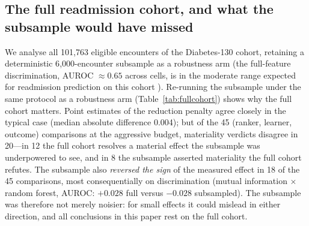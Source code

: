\documentclass[fleqn,10pt]{wlscirep}
\newcommand{\result}[1]{#1}
\begin{document}
\begin{table}[t]
\centering
\caption{Raw versus leakage-safe Platt- and isotonic-recalibrated reduction penalty at 25\,\% of
features (mean paired difference vs.\ full over the twelve datasets, \emph{all three rankers}, and
three learners---108 cells; positive ECE/Brier/AURC values indicate degradation, as do negative
AUROC/net-benefit values), with
the count of materially worse cells. Recalibration recovers the (learner-specific) calibration-error
penalty but not the AURC, Brier, or net-benefit loss, and isotonic does no better than Platt.
The pooled ECE row is dominated by the learners with little or no raw penalty to recover; the
recovery is visible in the random forest, reported in the text.
Computed from the released all-rankers recalibration-control summary.}
\label{tab:recal}

\end{table}

\subsection{The full readmission cohort, and what the subsample would have missed}
\label{sec:fullcohort}
We analyse all \result{101{,}763} eligible encounters of the Diabetes-130 cohort, retaining a
deterministic \result{6{,}000}-encounter subsample as a robustness arm (the full-feature discrimination, AUROC $\approx\result{0.65}$ across cells, is
in the moderate range expected for readmission prediction on this cohort \cite{strack2014impact}).
Re-running the subsample under the same protocol as a robustness arm
(Table~\ref{tab:fullcohort}) shows why the full cohort matters. Point estimates of the reduction
penalty agree closely in the typical case (median absolute difference \result{0.004}); but of the
\result{45} (ranker, learner, outcome) comparisons at the aggressive budget, materiality verdicts
disagree in \result{20}---in \result{12} the full cohort resolves a material effect the subsample was
underpowered to see, and in \result{8} the subsample asserted materiality the full cohort refutes.
The subsample also \emph{reversed the sign} of the measured effect in \result{18} of the
\result{45} comparisons, most consequentially on discrimination (mutual information $\times$
random forest, AUROC: \result{$+0.028$} full versus \result{$-0.028$} subsampled). The subsample was
therefore not merely noisier: for small effects it could mislead in either direction, and all
conclusions in this paper rest on the full cohort.

\begin{table}[t]
\centering
\caption{Subsample-agreement check on Diabetes-130: the reduction penalty at 25\,\% of features under
the full cohort versus the corrected $n{=}6{,}000$ robustness arm, per ranker, learner, and outcome,
with confidence-interval overlap and sign/verdict agreement. Computed from the released full-cohort
and robustness-arm summaries.}
\label{tab:fullcohort}

\end{table}
\end{document}
